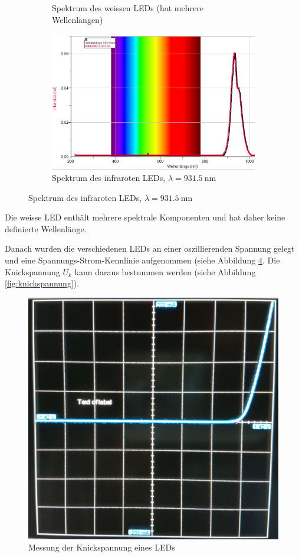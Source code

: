 \begin{figure}[H]
\begin{subfigure}{.3\linewidth}
        \caption{Spektrum des weissen LEDs (hat mehrere Wellenl\"angen)}
        \label{fig:led-white}
    \end{subfigure}
    \begin{subfigure}{.3\linewidth}
        \centering
        \includegraphics[width=\linewidth]{images/spectrum-IR.png}
        \caption{Spektrum des infraroten LEDs, $\lambda=\SI{931.5}{\nano\meter}$}
        \label{fig:led-IR}
    \end{subfigure}
\end{figure}

Die  weisse  LED  enth\"alt  mehrere spektrale Komponenten und hat daher keine
definierte Wellenl\"ange.

Danach wurden  die  verschiedenen LEDs an einer oszillierenden Spannung gelegt
und    eine    Spannungs-Strom-Kennlinie    aufgenommen    (siehe    Abbildung
\ref{fig:knickspannung-plot}. Die Knickspannung $U_k$  kann  daraus  bestummen
werden (siehe Abbildung \ref{fig:knickspannung}).

\begin{figure}[H]
    \centering
    \includegraphics[width=.5\linewidth]{images/knickspannung.png}
    \caption{Messung der Knickspannung eines LEDs}
    \label{fig:knickspannung-plot}
\end{figure}

